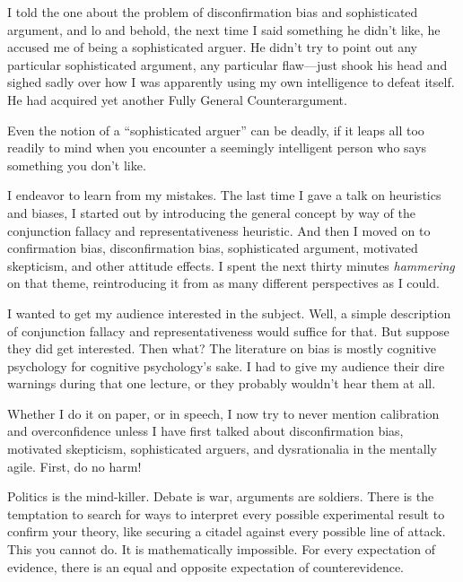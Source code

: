 {
 I told the one about the problem of disconfirmation bias and
sophisticated argument, and lo and behold, the next time I said
something he didn't like, he accused me of being a
sophisticated arguer. He didn't try to point out any
particular sophisticated argument, any particular flaw---just shook his
head and sighed sadly over how I was apparently using my own
intelligence to defeat itself. He had acquired yet another Fully
General Counterargument.}

{
 Even the notion of a ``sophisticated
arguer'' can be deadly, if it leaps all too readily
to mind when you encounter a seemingly intelligent person who says
something you don't like.}

{
 I endeavor to learn from my mistakes. The last time I gave a talk
on heuristics and biases, I started out by introducing the general
concept by way of the conjunction fallacy and representativeness
heuristic. And then I moved on to confirmation bias, disconfirmation
bias, sophisticated argument, motivated skepticism, and other attitude
effects. I spent the next thirty minutes \textit{hammering} on that
theme, reintroducing it from as many different perspectives as I
could.}

{
 I wanted to get my audience interested in the subject. Well, a
simple description of conjunction fallacy and representativeness would
suffice for that. But suppose they did get interested. Then what? The
literature on bias is mostly cognitive psychology for cognitive
psychology's sake. I had to give my audience their dire
warnings during that one lecture, or they probably
wouldn't hear them at all.}

{
 Whether I do it on paper, or in speech, I now try to never mention
calibration and overconfidence unless I have first talked about
disconfirmation bias, motivated skepticism, sophisticated arguers, and
dysrationalia in the mentally agile. First, do no harm!}

\myendsectiontext


\bigskip


{
 Politics is the mind-killer. Debate is war, arguments are
soldiers. There is the temptation to search for ways to interpret every
possible experimental result to confirm your theory, like securing a
citadel against every possible line of attack. This you cannot do. It
is mathematically impossible. For every expectation of evidence, there
is an equal and opposite expectation of counterevidence. }

